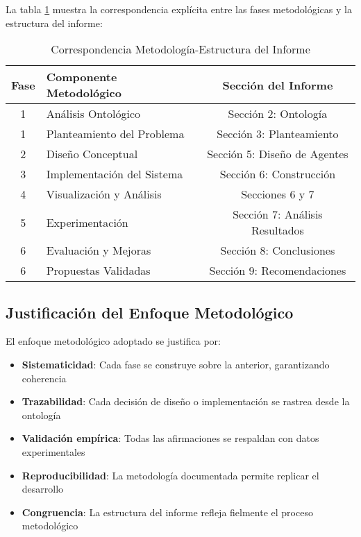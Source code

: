 \documentclass[10pt,twocolumn]{article}
\begin{document}
La tabla \ref{tab:metodologia_informe} muestra la correspondencia explícita entre las fases metodológicas y la estructura del informe:

\begin{table}[H]
\centering
\caption{Correspondencia Metodología-Estructura del Informe}
\label{tab:metodologia_informe}
\begin{tabular}{@{}clc@{}}
\toprule
\textbf{Fase} & \textbf{Componente Metodológico} & \textbf{Sección del Informe} \\
\midrule
1 & Análisis Ontológico & Sección 2: Ontología \\
1 & Planteamiento del Problema & Sección 3: Planteamiento \\
\midrule
2 & Diseño Conceptual & Sección 5: Diseño de Agentes \\
\midrule
3 & Implementación del Sistema & Sección 6: Construcción \\
\midrule
4 & Visualización y Análisis & Secciones 6 y 7 \\
\midrule
5 & Experimentación & Sección 7: Análisis Resultados \\
\midrule
6 & Evaluación y Mejoras & Sección 8: Conclusiones \\
6 & Propuestas Validadas & Sección 9: Recomendaciones \\
\bottomrule
\end{tabular}
\end{table}

\subsection{Justificación del Enfoque Metodológico}

El enfoque metodológico adoptado se justifica por:

\begin{itemize}
\item \textbf{Sistematicidad}: Cada fase se construye sobre la anterior, garantizando coherencia
\item \textbf{Trazabilidad}: Cada decisión de diseño o implementación se rastrea desde la ontología
\item \textbf{Validación empírica}: Todas las afirmaciones se respaldan con datos experimentales
\item \textbf{Reproducibilidad}: La metodología documentada permite replicar el desarrollo
\item \textbf{Congruencia}: La estructura del informe refleja fielmente el proceso metodológico
\end{itemize}
\end{document}
